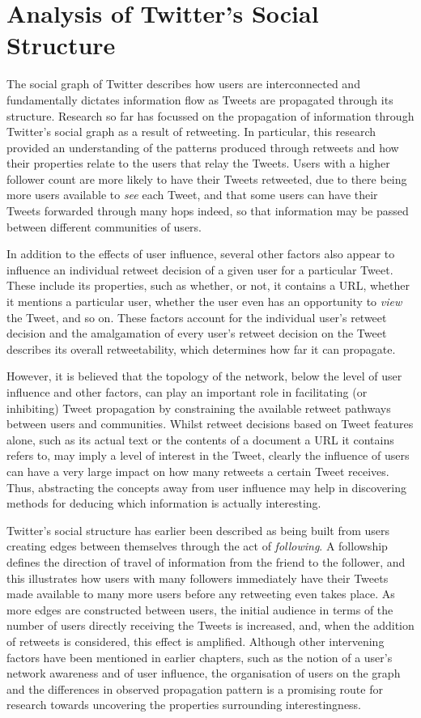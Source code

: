 \chapter{Analysis of Twitter's Social Structure}
The social graph of Twitter describes how users are interconnected and fundamentally dictates information flow as Tweets are propagated through its structure. Research so far has focussed on the propagation of information through Twitter's social graph as a result of retweeting. In particular, this research provided an understanding of the patterns produced through retweets and how their properties relate to the users that relay the Tweets. Users with a higher follower count are more likely to have their Tweets retweeted, due to there being more users available to \textit{see} each Tweet, and that some users can have their Tweets forwarded through many hops indeed, so that information may be passed between different communities of users.

In addition to the effects of user influence,  several other factors also appear to influence an individual retweet decision of a given user for a particular Tweet. These include its properties, such as whether, or not, it contains a URL, whether it mentions a particular user, whether the user even has an opportunity to \textit{view} the Tweet, and so on. These factors account for the individual user's retweet decision and the amalgamation of every user's retweet decision on the Tweet describes its overall retweetability, which determines how far it can propagate.

However, it is believed that the topology of the network, below the level of user influence and other factors, can play an important role in facilitating (or inhibiting) Tweet propagation by constraining the available retweet pathways between users and communities. Whilst retweet decisions based on Tweet features alone, such as its actual text or the contents of a document a URL it contains refers to, may imply a level of interest in the Tweet, clearly the influence of users can have a very large impact on how many retweets a certain Tweet receives. Thus, abstracting the concepts away from user influence may help in discovering methods for deducing which information is actually interesting.

Twitter's social structure has earlier been described as being built from users creating edges between themselves through the act of \textit{following}. A followship defines the direction of travel of information from the friend to the follower, and this illustrates how users with many followers immediately have their Tweets made available to many more users before any retweeting even takes place. As more edges are constructed between users, the initial audience in terms of the number of users directly receiving the Tweets is increased, and, when the addition of retweets is considered, this effect is amplified. Although other intervening factors have been mentioned in earlier chapters, such as the notion of a user's network awareness and of user influence, the organisation of users on the graph and the differences in observed propagation pattern is a promising route for research towards uncovering the properties surrounding interestingness.

